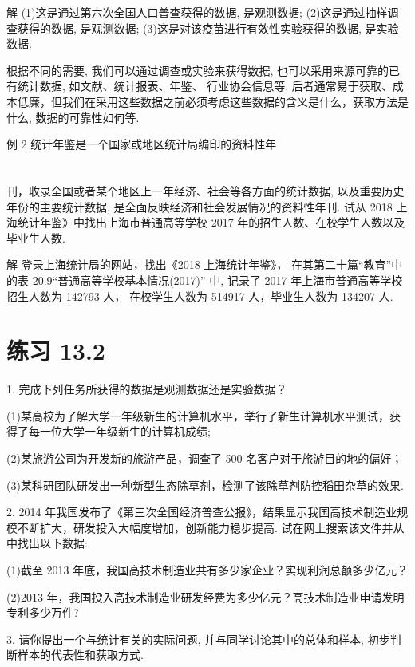 \documentclass[10pt]{article}
\begin{document}
解 (1)这是通过第六次全国人口普查获得的数据, 是观测数据; (2)这是通过抽样调查获得的数据, 是观测数据; (3)这是对该疫苗进行有效性实验获得的数据, 是实验数据.

根据不同的需要, 我们可以通过调查或实验来获得数据, 也可以采用来源可靠的已有统计数据, 如文献、统计报表、年鉴、 行业协会信息等. 后者通常易于获取、成本低廉，但我们在采用这些数据之前必须考虑这些数据的含义是什么，获取方法是什么, 数据的可靠性如何等.

例 2 统计年鉴是一个国家或地区统计局编印的资料性年



\section*{}

刊，收录全国或者某个地区上一年经济、社会等各方面的统计数据, 以及重要历史年份的主要统计数据, 是全面反映经济和社会发展情况的资料性年刊. 试从 2018 上海统计年鉴》中找出上海市普通高等学校 2017 年的招生人数、在校学生人数以及毕业生人数.

解 登录上海统计局的网站，找出《2018 上海统计年鉴》， 在其第二十篇“教育”中的表 20.9“普通高等学校基本情况(2017)” 中, 记录了 2017 年上海市普通高等学校招生人数为 142793 人， 在校学生人数为 514917 人，毕业生人数为 134207 人.

\section*{练习 13.2}

1. 完成下列任务所获得的数据是观测数据还是实验数据？

(1)某高校为了解大学一年级新生的计算机水平，举行了新生计算机水平测试，获得了每一位大学一年级新生的计算机成绩;

(2)某旅游公司为开发新的旅游产品，调查了 500 名客户对于旅游目的地的偏好；

(3)某科研团队研发出一种新型生态除草剂，检测了该除草剂防控稻田杂草的效果.

2. 2014 年我国发布了《第三次全国经济普查公报》，结果显示我国高技术制造业规模不断扩大，研发投入大幅度增加，创新能力稳步提高. 试在网上搜索该文件并从中找出以下数据:

(1)截至 2013 年底，我国高技术制造业共有多少家企业？实现利润总额多少亿元？

(2)2013 年，我国投入高技术制造业研发经费为多少亿元？高技术制造业申请发明专利多少万件?

3. 请你提出一个与统计有关的实际问题, 并与同学讨论其中的总体和样本, 初步判断样本的代表性和获取方式.
\end{document}

